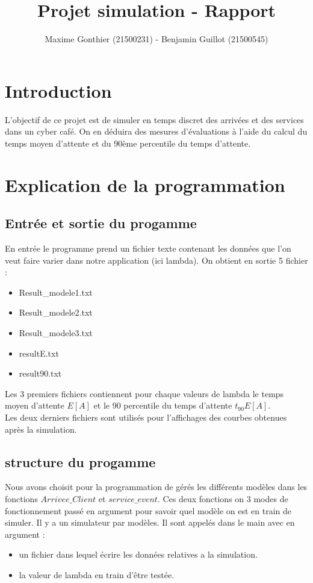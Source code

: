 \documentclass[a4paper,11pt]{article}
\title{Projet simulation - Rapport}
\author{Maxime Gonthier (21500231) - Benjamin Guillot (21500545)}
\begin{document}
\clearpage
\maketitle

\newpage
\tableofcontents

\newpage
\section{Introduction}
	L'objectif de ce projet est de simuler en temps discret des arrivées et des services dans un cyber café. On en déduira des mesures d'évaluations à l'aide du calcul du temps moyen d'attente et du 90ème percentile du temps d'attente. 
	
\section{Explication de la programmation}
	\subsection{Entrée et sortie du progamme}
	En entrée le programme prend un fichier texte contenant les données que l'on veut faire varier dans notre application (ici lambda).
	On obtient en sortie 5 fichier :
	\begin{itemize}
		\item Result\_modele1.txt
		\item Result\_modele2.txt
		\item Result\_modele3.txt
		\item resultE.txt
		\item result90.txt
	\end{itemize}
	Les 3 premiers fichiers contiennent pour chaque valeurs de lambda le temps moyen d'attente $E[A]$ et le 90 percentile du temps d'attente $t_{90}E[A]$.\\
	Les deux derniers fichiers sont utilisés pour l'affichages des courbes obtenues après la simulation.
	\subsection{structure du progamme}
	Nous avons choisit pour la programmation de gérés les différents modèles dans les fonctions $Arrivee\_Client$ et $service\_event$. Ces deux fonctions on 3 modes de fonctionnement
	passé en argument pour savoir quel modèle on est en train de simuler. Il y a un simulateur par modèles.
	Il sont appelés dans le main avec en argument :
	\begin{itemize}
		\item un fichier dans lequel écrire les données relatives a la simulation.
		\item la valeur de lambda en train d'être testée.
	\end{itemize}
\end{document}
